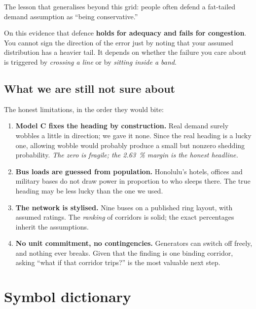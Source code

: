 \documentclass[11pt,a4paper]{article}
\begin{document}
\begin{watch}
The lesson that generalises beyond this grid: people often defend a fat-tailed
demand assumption as ``being conservative.''

On this evidence that defence \textbf{holds for adequacy and fails for
congestion}. You cannot sign the direction of the error just by noting that
your assumed distribution has a heavier tail. It depends on whether the failure
you care about is triggered by \emph{crossing a line} or by \emph{sitting inside
a band}.
\end{watch}

\subsection{What we are still not sure about}

The honest limitations, in the order they would bite:

\begin{enumerate}[label=\textbf{L\arabic*.}]
\item \textbf{Model C fixes the heading by construction.} Real demand surely
wobbles a little in direction; we gave it none. Since the real heading is a
lucky one, allowing wobble would probably produce a small but nonzero shedding
probability. \emph{The zero is fragile; the \SI{2.63}{\percent} margin is the
honest headline.}

\item \textbf{Bus loads are guessed from population.} Honolulu's hotels,
offices and military bases do not draw power in proportion to who sleeps there.
The true heading may be less lucky than the one we used.

\item \textbf{The network is stylised.} Nine buses on a published ring layout,
with assumed ratings. The \emph{ranking} of corridors is solid; the exact
percentages inherit the assumptions.

\item \textbf{No unit commitment, no contingencies.} Generators can switch off
freely, and nothing ever breaks. Given that the finding is one binding corridor,
asking ``what if that corridor trips?'' is the most valuable next step.
\end{enumerate}

\section{Symbol dictionary}
\end{document}
